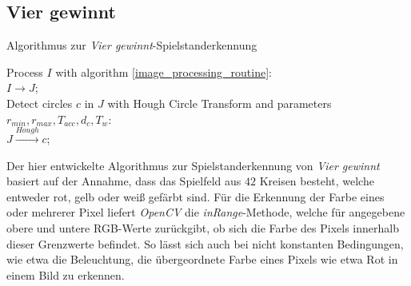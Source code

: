 \subsection{Vier gewinnt}

\begin{algorithm}[!htbp]
    \LinesNumbered
    \SetAlgoLined
    \caption{Algorithmus zur \textit{Vier gewinnt}-Spielstanderkennung}\label{alg:connect4_detection}
    Process $I$ with algorithm \vref{image_processing_routine}:\\
    $I \rightarrow J$;\\
    Detect circles $c$ in $J$ with Hough Circle Transform and parameters $r_{min}, r_{max}, T_{acc}, d_c, T_w$:\\
    $J \xrightarrow{Hough} c$;\\
\end{algorithm}

Der hier entwickelte Algorithmus zur Spielstanderkennung von \textit{Vier gewinnt} basiert auf der Annahme, dass das Spielfeld aus $42$ Kreisen besteht, welche entweder rot, gelb oder weiß gefärbt sind. Für die Erkennung der Farbe eines oder mehrerer Pixel liefert \textit{OpenCV} die \textit{inRange}-Methode, welche für angegebene obere und untere RGB-Werte zurückgibt, ob sich die Farbe des Pixels innerhalb dieser Grenzwerte befindet. So lässt sich auch bei nicht konstanten Bedingungen, wie etwa die Beleuchtung, die übergeordnete Farbe eines Pixels wie etwa \dq Rot \dq in einem Bild zu erkennen.

